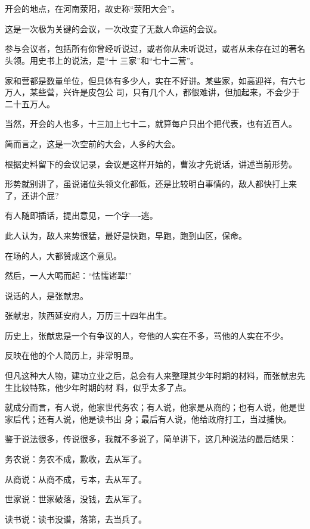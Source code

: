\documentclass[11pt,a4paper,onecolumn]{article}
\begin{document}
\section[\thesection]{}

开会的地点，在河南荥阳，故史称``荥阳大会''。

这是一次极为关键的会议，一次改变了无数人命运的会议。

参与会议者，包括所有你曾经听说过，或者你从未听说过，或者从未存在过的著名头领。用史书上的说法，是``十
三家''和``七十二营''。

家和营都是数量单位，但具体有多少人，实在不好讲。某些家，如高迎祥，有六七万人，某些营，兴许是皮包公
司，只有几个人，都很难讲，但加起来，不会少于二十五万人。

当然，开会的人也多，十三加上七十二，就算每户只出个把代表，也有近百人。

简而言之，这是一次空前的大会，人多的大会。

根据史料留下的会议记录，会议是这样开始的，曹汝才先说话，讲述当前形势。

形势就别讲了，虽说诸位头领文化都低，还是比较明白事情的，敌人都快打上来了，还讲个屁?

有人随即插话，提出意见，一个字----逃。

此人认为，敌人来势很猛，最好是快跑，早跑，跑到山区，保命。

在场的人，大都赞成这个意见。

然后，一人大喝而起：``怯懦诸辈!''

说话的人，是张献忠。

张献忠，陕西延安府人，万历三十四年出生。

历史上，张献忠是一个有争议的人，夸他的人实在不多，骂他的人实在不少。

反映在他的个人简历上，非常明显。

但凡这种大人物，建功立业之后，总会有人来整理其少年时期的材料，而张献忠先生比较特殊，他少年时期的材
料，似乎太多了点。

就成分而言，有人说，他家世代务农；有人说，他家是从商的；也有人说，他是世家后代；还有人说，他是读书出
身；最后有人说，他给政府打工，当过捕快。

鉴于说法很多，传说很多，我就不多说了，简单讲下，这几种说法的最后结果：

务农说：务农不成，歉收，去从军了。

从商说：从商不成，亏本，去从军了。

世家说：世家破落，没钱，去从军了。

读书说：读书没谱，落第，去当兵了。
\end{document}
